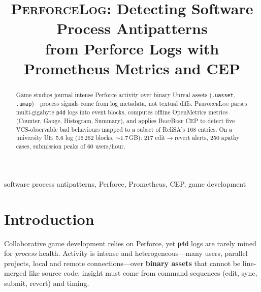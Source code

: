 \documentclass[conference]{IEEEtran}
\newcommand{\toolname}{\textsc{PerforceLog}}
\newcommand{\beepbeep}{\textsc{BeepBeep}}
\begin{document}
\title{\toolname{}: Detecting Software Process Antipatterns\\
from Perforce Logs with Prometheus Metrics and CEP}

\author{
\and
{}
}

\maketitle

\begin{abstract}
Game studios journal intense Perforce activity over binary Unreal assets
(\texttt{.uasset}, \texttt{.umap})---process signals come from log
metadata, not textual diffs. \toolname{} parses multi-gigabyte \texttt{p4d}
logs into event blocks, computes offline OpenMetrics metrics (Counter,
Gauge, Histogram, Summary), and applies \beepbeep{} CEP to detect five
VCS-observable bad behaviours mapped to a subset of ReliSA's 168 entries.
On a university UE~5.6 log (16\,262 blocks, ${\sim}$1.7\,GB): 217
edit$\rightarrow$revert alerts, 250 apathy cases, submission peaks of 60
users/hour.
\end{abstract}

\begin{IEEEkeywords}
software process antipatterns, Perforce, Prometheus, CEP, game development
\end{IEEEkeywords}

\section{Introduction}
\label{sec:intro}

Collaborative game development relies on Perforce, yet \texttt{p4d} logs are
rarely mined for \emph{process} health. Activity is intense and
heterogeneous---many users, parallel projects, local and remote
connections---over \textbf{binary assets} that cannot be line-merged like
source code; insight must come from command sequences (edit, sync, submit,
revert) and timing.
\end{document}

